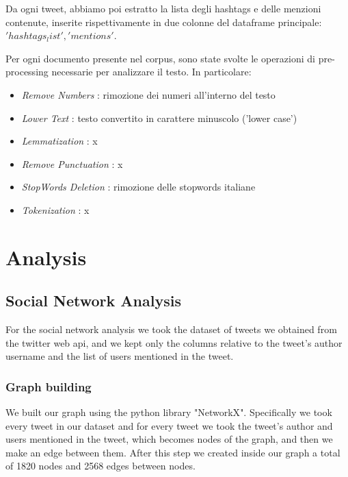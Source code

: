 \documentclass[12pt,journal,compsoc]{IEEEtran}
\begin{document}
Da ogni tweet, abbiamo poi estratto la lista degli hashtags e delle menzioni contenute, inserite rispettivamente in due colonne del dataframe principale: $'hashtags_list', 'mentions'$.

Per ogni documento presente nel corpus, sono state svolte le operazioni di pre-processing necessarie per analizzare il testo. In particolare:

\begin{itemize}
	\item \textit{Remove Numbers} : rimozione dei numeri all'interno del testo
	\item \textit{Lower Text} : testo convertito in carattere minuscolo ('lower case')
	\item \textit{Lemmatization} : x
	\item \textit{Remove Punctuation} : x
	\item \textit{StopWords Deletion} : rimozione delle stopwords italiane
	\item \textit{Tokenization} : x
\end{itemize}

\section{Analysis}
\subsection{Social Network Analysis}
For the social network analysis we took the dataset of tweets we obtained from the twitter web api, and we kept only the columns relative to the tweet's author username and the list of users mentioned in the tweet. 
\subsubsection{Graph building}
We built our graph using the python library "NetworkX\cite{NetworkX}". Specifically we took every tweet in our dataset and for every tweet we took the tweet's author and users mentioned in the tweet, which becomes nodes of the graph, and then we make an edge between them. After this step we created inside our graph a total of 1820 nodes and 2568 edges between nodes.
\end{document}
